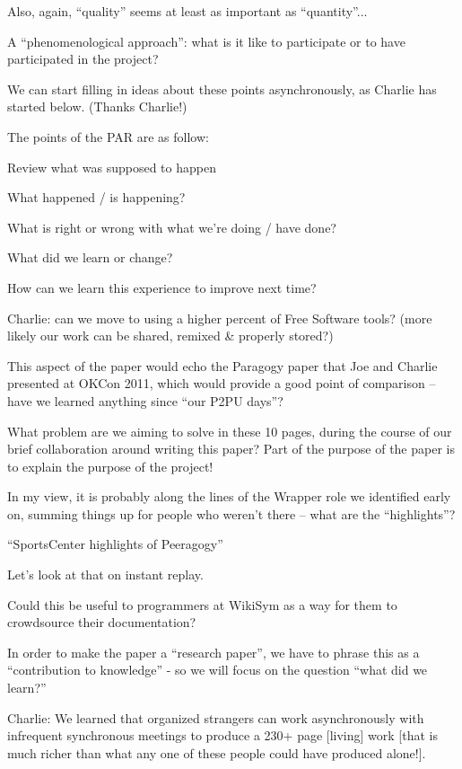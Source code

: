 \documentclass[twoside]{article}
\begin{document}
\begin{multicols}{2}
        Also, again, ``quality'' seems at least as important as ``quantity''... 

    A ``phenomenological approach'': what is it like to participate or to have participated in the project?


            We can start filling in ideas about these points asynchronously, as Charlie has started below. (Thanks Charlie!)

        The points of the PAR are as follow:

            Review what was supposed to happen

            What happened / is happening?

            What is right or wrong with what we're doing / have done?

            What did we learn or change?

            How can we learn this experience to improve next time?

                Charlie: can we move to using a higher percent of Free Software tools? (more likely our work can be shared, remixed \& properly stored?)

        This aspect of the paper would echo the Paragogy paper that Joe and Charlie presented at OKCon 2011, which would provide a good point of comparison -- have we learned anything since ``our P2PU days''?

What problem are we aiming to solve in these 10 pages, during the
course of our brief collaboration around writing this paper? Part of
the purpose of the paper is to explain the purpose of the project!

In my view, it is probably along the lines of the Wrapper role we
identified early on, summing things up for people who weren't there --
what are the ``highlights''?

``SportsCenter highlights of Peeragogy''

Let's look at that on instant replay.

Could this be useful to programmers at WikiSym as a way for them to crowdsource their documentation?

In order to make the paper a ``research paper'', we have to phrase
this as a ``contribution to knowledge'' - so we will focus on the
question ``what did we learn?''

Charlie: We learned that organized strangers can work asynchronously
with infrequent synchronous meetings to produce a 230+ page [living]
work [that is much richer than what any one of these people could have
  produced alone!].


\end{multicols}
\end{document}

